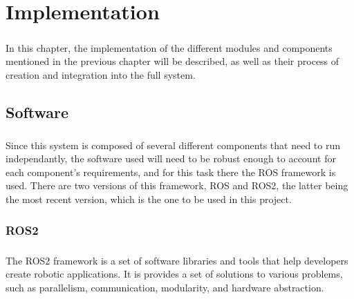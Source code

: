 
%

\chapter{Implementation}
\label{cha:implementation}

\paragraph{}In this chapter, the implementation of the different modules 
and components mentioned in the previous chapter will be described, 
as well as their process of creation and integration into the 
full system.

\section{Software}
\label{sec:software}
\paragraph{}Since this system is composed of several different components that need 
to run independantly, the software used will need to be robust enough to account for 
each component's requirements, and for this task there the \gls{ROS} framework is used.
There are two versions of this framework, \gls{ROS} and \gls{ROS2}, the latter being the 
most recent version, which is the one to be used in this project.

\subsection{ROS2}
\label{subsec:ros2}
\paragraph{}The \gls{ROS2} framework is a set of software libraries and tools that 
help developers create robotic applications. It is provides a set of solutions to various 
problems, such as parallelism, communication, modularity, and hardware abstraction.

